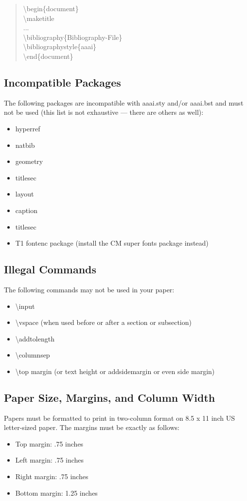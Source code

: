 \documentclass[letterpaper]{article}
\begin{document}
\begin{quote}
  \begin{small}
    \textbackslash begin\{document\}\\
    \textbackslash maketitle\\
    ...\\
    \textbackslash bibliography\{Bibliography-File\}\\
    \textbackslash bibliographystyle\{aaai\}\\
    \textbackslash end\{document\}\\
  \end{small}
\end{quote}
\subsection{Incompatible Packages}
The following packages are incompatible with aaai.sty and/or aaai.bst and must not be used (this list is not exhaustive --- there are others as well):
\begin{itemize}
  \item hyperref
  \item natbib
  \item geometry
  \item titlesec
  \item layout
  \item caption
  \item titlesec
  \item T1 fontenc package (install the CM super fonts package instead)
\end{itemize}

\subsection{Illegal Commands}
The following commands may not be used in your paper:
\begin{itemize}
  \item \textbackslash input
  \item \textbackslash vspace (when used before or after a section or subsection)
  \item \textbackslash addtolength
  \item \textbackslash columnsep
  \item \textbackslash top margin (or text height or addsidemargin or even side margin)
\end{itemize}

\subsection{Paper Size, Margins, and Column Width}
Papers must be formatted to print in two-column format on 8.5 x 11 inch US letter-sized paper. The margins must be exactly as follows:
\begin{itemize}
  \item Top margin: .75 inches
  \item Left margin: .75 inches
  \item Right margin: .75 inches
  \item Bottom margin: 1.25 inches
\end{itemize}
\end{document}
